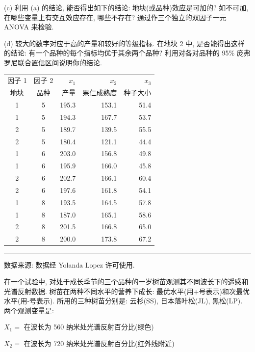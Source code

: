 
\noindent (c) 利用 (a) 的结论, 能否得出如下的结论: 地块(或品种)效应是可加的? 如不可加, 在哪些变量上有交互效应存在, 哪些不存在? 通过作三个独立的双因子一元 ANOVA 来检验.

\noindent (d) 较大的数字对应于高的产量和较好的等级指标. 在地块 2 中, 是否能得出这样的结论: 有一个品种的每个指标均优于其余两个品种? 利用对各对品种的 95\% 庞弗罗尼联合置信区间说明你的结论.

\begin{mvtable}
\label{tab:6.17}
\begin{tabular}{ccrrr}
\toprule
因子 1 & 因子 2 & $x_1$ & $x_2$ & $x_3$\\
地块 & 品种 & 产量 & 果仁成熟度 & 种子大小\\\midrule
1 & 5 & 195.3 & 153.1 & 51.4\\
1 & 5 & 194.3 & 167.7 & 53.7\\
2 & 5 & 189.7 & 139.5 & 55.5\\
2 & 5 & 180.4 & 121.1 & 44.4\\
1 & 6 & 203.0 & 156.8 & 49.8\\
1 & 6 & 195.9 & 166.0 & 45.8\\
2 & 6 & 202.7 & 166.1 & 60.4\\
2 & 6 & 197.6 & 161.8 & 54.1\\
1 & 8 & 193.5 & 164.5 & 57.8\\
1 & 8 & 187.0 & 165.1 & 58.6\\
2 & 8 & 201.5 & 166.8 & 65.0\\
2 & 8 & 200.0 & 173.8 & 67.2\\
\bottomrule
\end{tabular}
\end{mvtable}

\vspace{2pt}
\noindent\rule{\linewidth}{0.4pt}

\noindent\small 数据来源: 数据经 Yolanda Lopez 许可使用.

\vspace{1em}
\quad 在一个试验中, 对处于成长季节的三个品种的一岁树苗观测其不同波长下的遥感和光谱反射数据. 树苗在两种不同水平的营养下成长: 最优水平(用+号表示)和次最优水平(用-号表示). 所用的三种树苗分别是: 云杉(SS), 日本落叶松(JL), 黑松(LP). 两个观测变量是:

\noindent $X_1=$ 在波长为 560 纳米处光谱反射百分比(绿色)

\noindent $X_2=$ 在波长为 720 纳米处光谱反射百分比(红外线附近)

